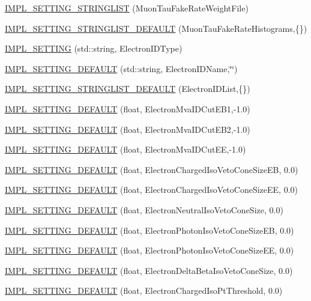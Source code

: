 \begin{DoxyCompactItemize}
\item 
\hyperlink{classHttSettings_a4513b0e4e3fb25e4513b2cc2efc5e719}{IMPL\_\-SETTING\_\-STRINGLIST} (MuonTauFakeRateWeightFile)
\item 
\hyperlink{classHttSettings_a5b32353f2911a93bd6046427ee91f59c}{IMPL\_\-SETTING\_\-STRINGLIST\_\-DEFAULT} (MuonTauFakeRateHistograms,\{\})
\item 
\hyperlink{classHttSettings_a26c8ae57efd90dbab0c4ddd2b3e9a490}{IMPL\_\-SETTING} (std::string, ElectronIDType)
\item 
\hyperlink{classHttSettings_a003594f674aeb36ae7f899e790b819ed}{IMPL\_\-SETTING\_\-DEFAULT} (std::string, ElectronIDName,\char`\"{}\char`\"{})
\item 
\hyperlink{classHttSettings_ae9f77a258468ff234e15c2746addbe38}{IMPL\_\-SETTING\_\-STRINGLIST\_\-DEFAULT} (ElectronIDList,\{\})
\item 
\hyperlink{classHttSettings_a147c34ffb4aeb6b02f2a02f37dc59781}{IMPL\_\-SETTING\_\-DEFAULT} (float, ElectronMvaIDCutEB1,-\/1.0)
\item 
\hyperlink{classHttSettings_afd05c28dd3bb00cf4732a0bc87901b34}{IMPL\_\-SETTING\_\-DEFAULT} (float, ElectronMvaIDCutEB2,-\/1.0)
\item 
\hyperlink{classHttSettings_ac290c24384bca58c474b0c2b97c2a382}{IMPL\_\-SETTING\_\-DEFAULT} (float, ElectronMvaIDCutEE,-\/1.0)
\item 
\hyperlink{classHttSettings_a4320a54adcb8df7075bc219c9c21a098}{IMPL\_\-SETTING\_\-DEFAULT} (float, ElectronChargedIsoVetoConeSizeEB, 0.0)
\item 
\hyperlink{classHttSettings_a6072701632fb21cf187072f41fa1c88b}{IMPL\_\-SETTING\_\-DEFAULT} (float, ElectronChargedIsoVetoConeSizeEE, 0.0)
\item 
\hyperlink{classHttSettings_a0f6830aa0568d5000b5ee7b7fc066e58}{IMPL\_\-SETTING\_\-DEFAULT} (float, ElectronNeutralIsoVetoConeSize, 0.0)
\item 
\hyperlink{classHttSettings_a0bb6fa869d920c9d97e0a0a5978d4e08}{IMPL\_\-SETTING\_\-DEFAULT} (float, ElectronPhotonIsoVetoConeSizeEB, 0.0)
\item 
\hyperlink{classHttSettings_aa2601b20bc336ea96cdba63e4ecb5efb}{IMPL\_\-SETTING\_\-DEFAULT} (float, ElectronPhotonIsoVetoConeSizeEE, 0.0)
\item 
\hyperlink{classHttSettings_ade12a467db9b7a59ff20c73fa11bd768}{IMPL\_\-SETTING\_\-DEFAULT} (float, ElectronDeltaBetaIsoVetoConeSize, 0.0)
\item 
\hyperlink{classHttSettings_a71a51453e53eef46fd821b8a2b66382f}{IMPL\_\-SETTING\_\-DEFAULT} (float, ElectronChargedIsoPtThreshold, 0.0)

\end{DoxyCompactItemize}
